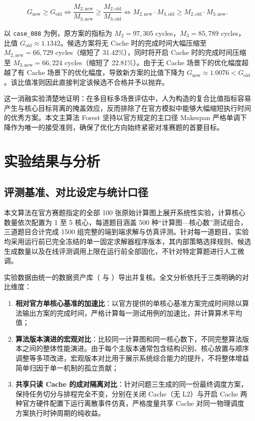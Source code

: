 \documentclass[anonymous,withtoc]{gmcm2026}
\providecommand{\tightlist}{\setlength{\itemsep}{0pt}\setlength{\parskip}{0pt}}
\begin{document}
\begin{equation}
G_{\mathrm{new}} \ge G_{\mathrm{old}} \iff \frac{M_{2, \mathrm{new}}}{M_{3, \mathrm{new}}} \ge \frac{M_{2, \mathrm{old}}}{M_{3, \mathrm{old}}} \iff M_{2, \mathrm{new}} \cdot M_{3, \mathrm{old}} \ge M_{2, \mathrm{old}} \cdot M_{3, \mathrm{new}}.
\end{equation}

以 \texttt{case\_088} 为例，原方案的指标为 \(M_2 = 97{,}305\) cycles，\(M_3 = 85{,}789\) cycles，比值 \(G_{\mathrm{old}} \approx 1.1342\)。候选方案将无 Cache 时的完成时间大幅压缩至 \(M_{2, \mathrm{new}} = 66{,}729\) cycles（缩短了 31.42\%），同时将开启 Cache 时的完成时间压缩至 \(M_{3, \mathrm{new}} = 66{,}224\) cycles（缩短了 22.81\%）。由于无 Cache 场景下的优化幅度超越了有 Cache 场景下的优化幅度，导致新方案的比值下降为 \(G_{\mathrm{new}} \approx 1.0076 < G_{\mathrm{old}}\)。该比值准则因此直接判定该候选不合格并予以抛弃。

这一消融实验清楚地证明：在多目标多场景评估中，人为构造的复合比值指标容易产生与核心目标背离的掩盖效应，反而排除了在官方模拟中能够大幅缩短执行时间的优秀方案。本文主算法 Forest 坚持以官方规定的主口径 Makespan 严格单调下降作为唯一的接受准则，确保了优化方向始终紧密对准赛题的首要目标。


\section{实验结果与分析}

\subsection{评测基准、对比设定与统计口径}

本文算法在官方赛题指定的全部 100 张原始计算图上展开系统性实验，计算核心数量依次配置为 1 至 5 核心，每道题目涵盖 500 种``计算图---核心数''测试组合，三道题目合计完成 1500 组完整的端到端求解与仿真评测。针对每一道题目，实验均采用运行前已完全冻结的单一固定求解器程序版本，其内部策略选择规则、候选生成数量以及在线评测调用上限在运行前全部固化，不针对特定算题进行人工微调。

实验数据由统一的数据资产库（\texttt{} 与 \texttt{}）导出并复核。全文分析依托于三类明确的对比维度：

\begin{enumerate}
\def\labelenumi{\arabic{enumi}.}
\tightlist
\item
  \textbf{相对官方单核心基准的加速比}：以官方提供的单核心基准方案完成时间除以算法输出方案的完成时间，严格计算每一测试用例的加速比，并计算算术平均值；
\item
  \textbf{算法版本演进的宏观对比}：比较同一计算图和同一核心数下，不同完整算法版本之间的整体性能演进。由于每个主版本通常包含结构识别、核心放置与顺序调整等多项改进，宏观版本对比用于展示系统综合能力的提升，不将整体增益简单归因于单一机制的孤立贡献；
\item
  \textbf{共享只读 Cache 的成对隔离对比}：针对问题三生成的同一份最终调度方案，保持任务切分与排程完全不变，分别在关闭 Cache（无 L2）与开启 Cache 两种官方硬件配置下运行离散事件仿真，严格度量共享 Cache 对同一物理调度方案执行时钟周期的纯收益。
\end{enumerate}
\end{document}
